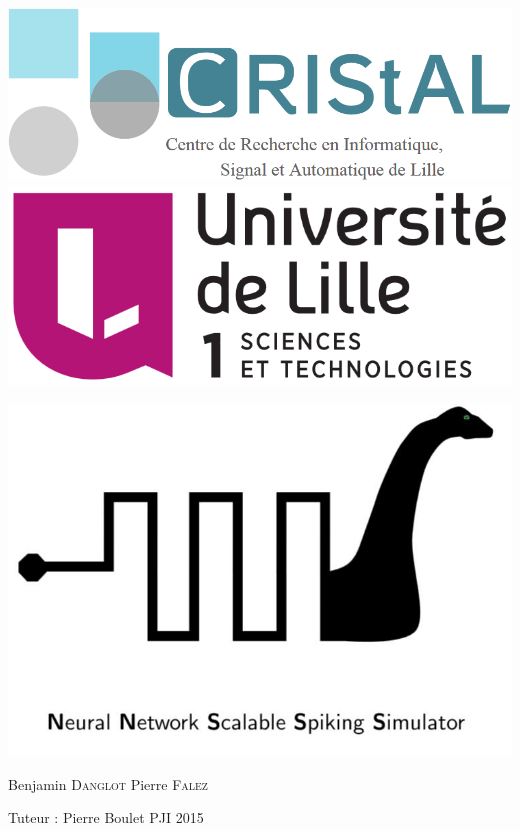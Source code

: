 \documentclass[a4paper,10pt]{article}
\begin{document}

\includegraphics[scale=0.1]{image/cristal.png}
\hfill
\includegraphics[scale=0.1]{image/lille1.png}

\vspace*{4cm}

\includegraphics[scale=0.4]{image/n2s3.jpg}

\vfill
{\LARGE
\noindent
	Benjamin \textsc{Danglot}\newline
	Pierre \textsc{Falez}
}

\vfill
{
\noindent
{\LARGE Tuteur : Pierre Boulet} \hfill PJI 2015 
}

\newpage

\end{document}
